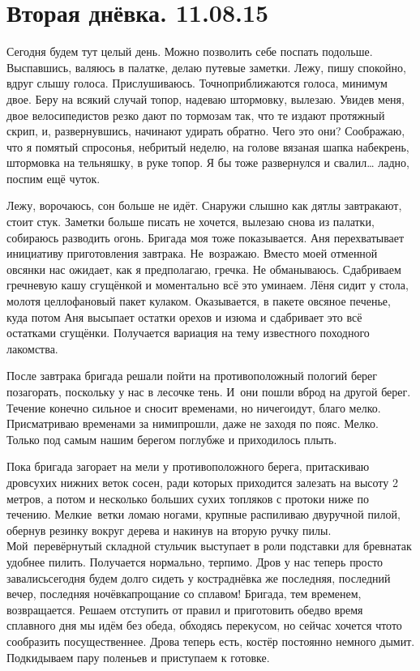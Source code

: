 \chapter{Вторая днёвка. 11.08.15}

Сегодня будем тут целый день. Можно позволить себе поспать подольше. Выспавшись, валяюсь в палатке, делаю путевые заметки. Лежу, пишу спокойно, вдруг слышу голоса. Прислушиваюсь. Точно\mdash приближаются голоса, минимум двое. Беру на всякий случай топор, надеваю штормовку, вылезаю. Увидев меня, двое велосипедистов резко дают по тормозам так, что те издают протяжный скрип, и, развернувшись, начинают удирать обратно. Чего это они? Соображаю, что я помятый спросонья, небритый неделю, на голове вязаная шапка набекрень, штормовка на тельняшку, в руке топор. Я бы тоже развернулся и свалил… ладно, поспим ещё чуток. 

Лежу, ворочаюсь, сон больше не идёт. Снаружи слышно как дятлы завтракают, стоит стук. Заметки больше писать не хочется, вылезаю снова из палатки, собираюсь разводить огонь. Бригада моя тоже показывается. Аня перехватывает инициативу приготовления завтрака. Не~возражаю. Вместо моей отменной овсянки нас ожидает, как я предполагаю, гречка. Не обманываюсь. Сдабриваем гречневую кашу сгущёнкой и моментально всё это уминаем. Лёня сидит у стола, молотя целлофановый пакет кулаком. Оказывается, в пакете овсяное печенье, куда потом Аня высыпает остатки орехов и изюма и сдабривает это всё остатками сгущёнки. Получается вариация на тему известного походного лакомства.

После завтрака бригада решали пойти на противоположный пологий берег позагорать, поскольку у нас в лесочке тень. И~они пошли вброд на другой берег. Течение конечно сильное и сносит временами, но ничего\mdash идут, благо мелко. Присматриваю временами за ними\mdash прошли, даже не заходя по пояс. Мелко. Только под самым нашим берегом поглубже и приходилось плыть. 

Пока бригада загорает на мели у противоположного берега, притаскиваю дров\mdash сухих нижних веток сосен, ради которых приходится залезать на высоту 2 метров, а потом и несколько больших сухих топляков с протоки ниже по течению. Мелкие~ветки ломаю ногами, крупные распиливаю двуручной пилой, обернув резинку вокруг дерева и накинув на вторую ручку пилы. Мой~перевёрнутый складной стульчик выступает в роли подставки для бревна\mdash так удобнее пилить. Получается нормально, терпимо. Дров у нас теперь просто завались\mdash сегодня будем долго сидеть у костра\mdash днёвка же последняя, последний вечер, последняя ночёвка\mdash прощание со сплавом! Бригада, тем временем, возвращается. Решаем отступить от правил и приготовить обед\mdash во время сплавного дня мы идём без обеда, обходясь перекусом, но сейчас хочется что\sdash то сообразить посущественнее. Дрова теперь есть, костёр постоянно немного дымит. Подкидываем пару поленьев и приступаем к готовке.

